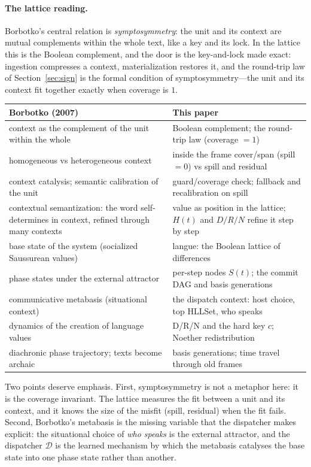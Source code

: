 \documentclass[11pt,a4paper]{article}
\theoremstyle{remark}
\newcommand{\Disp}{\ensuremath{\mathcal{D}}}             %
\begin{document}
\paragraph{The lattice reading.}
Borbotko's central relation is \emph{symptosymmetry}: the unit and its context
are mutual complements within the whole text, like a key and its lock. In the
lattice this is the Boolean complement, and the door is the key-and-lock made
exact: ingestion compresses a context, materialization restores it, and the
round-trip law of Section~\ref{sec:sign} is the formal condition of
symptosymmetry---the unit and its context fit together exactly when coverage
is $1$.

\begin{center}
\begin{tabular}{@{}>{\raggedright\arraybackslash}p{6.0cm}
                    >{\raggedright\arraybackslash}p{9.4cm}@{}}
\toprule
Borbotko (2007) & This paper \\
\midrule
context as the complement of the unit within the whole & Boolean complement; the round-trip law (coverage $=1$) \\
homogeneous vs heterogeneous context & inside the frame cover/span (spill $=0$) vs spill and residual \\
context catalysis; semantic calibration of the unit & guard/coverage check; fallback and recalibration on spill \\
contextual semantization: the word self-determines in context, refined through many contexts & value as position in the lattice; $H(t)$ and $D/R/N$ refine it step by step \\
base state of the system (socialized Saussurean values) & langue: the Boolean lattice of differences \\
phase states under the external attractor & per-step nodes $S(t)$; the commit DAG and basis generations \\
communicative metabasis (situational context) & the dispatch context: host choice, top HLLSet, who speaks \\
dynamics of the creation of language values & D/R/N and the hard key $c$; Noether redistribution \\
diachronic phase trajectory; texts become archaic & basis generations; time travel through old frames \\
\bottomrule
\end{tabular}
\end{center}

Two points deserve emphasis. First, symptosymmetry is not a metaphor here: it
is the coverage invariant. The lattice measures the fit between a unit and its
context, and it knows the size of the misfit (spill, residual) when the fit
fails. Second, Borbotko's metabasis is the missing variable that the
dispatcher makes explicit: the situational choice of \emph{who speaks} is the
external attractor, and the dispatcher $\Disp$ is the learned mechanism by
which the metabasis catalyses the base state into one phase state rather than
another.
\end{document}
